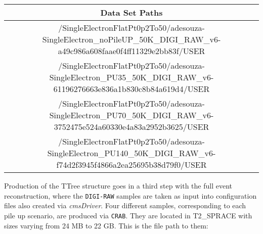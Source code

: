 \documentclass[a4paper,12pt,oneside]{article}
\begin{document}
\begin{table}[!htb]
\begin{tabular}{c}
{\bf Data Set Paths} \\ \hline \hline
/SingleElectronFlatPt0p2To50/adesouza-SingleElectron\_noPileUP\_50K\_DIGI\_RAW\_v6-a49c986a608faae0f4ff11329e2bb83f/USER                         \\
/SingleElectronFlatPt0p2To50/adesouza-SingleElectron\_PU35\_50K\_DIGI\_RAW\_v6-61196276663e836a1b830c8b84a619d4/USER                         \\
/SingleElectronFlatPt0p2To50/adesouza-SingleElectron\_PU70\_50K\_DIGI\_RAW\_v6-3752475e524a60330e4a83a2952b3625/USER                         \\
/SingleElectronFlatPt0p2To50/adesouza-SingleElectron\_PU140\_50K\_DIGI\_RAW\_v6-f74d2f3945f4866a2ea25695b38d79f0/USER                         \\ \hline
                     \end{tabular}
                   \end{table}

                   Production of the TTree structure goes in a third step with the full event reconstruction, where the
                   \texttt{DIGI-RAW} samples are taken as input into configuration files also created via {\it cmsDriver}.
                   Four different samples, corresponding to each pile up scenario, are produced via \texttt{CRAB}. They are
                   located in T2\_SPRACE with sizes varying from 24 MB to 22 GB. This is the file path to them:
\end{document}

